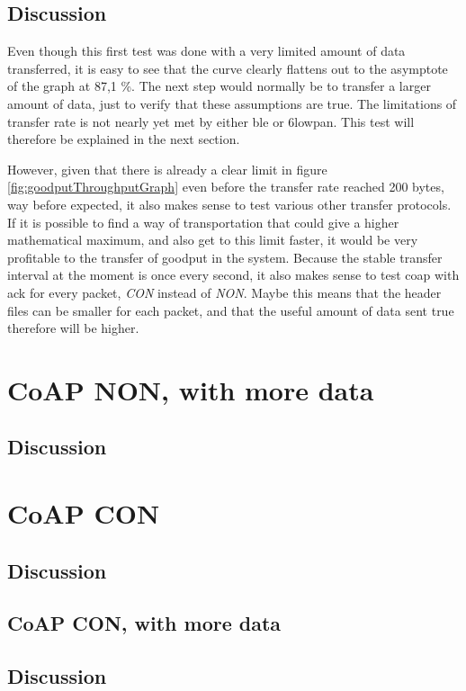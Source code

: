 \subsection{Discussion}

Even though this first test was done with a very limited amount of data transferred, it is easy to see that the curve clearly flattens out to the asymptote of the graph at 87,1 \%. The next step would normally be to transfer a larger amount of data, just to verify that these assumptions are true. The limitations of transfer rate is not nearly yet met by either \gls{ble} or \gls{6lowpan}. This test will therefore be explained in the next section. 

However, given that there is already a clear limit in figure \ref{fig:goodputThroughputGraph} even before the transfer rate reached 200 bytes, way before expected, it also makes sense to test various other transfer protocols. If it is possible to find a way of transportation that could give a higher mathematical maximum, and also get to this limit faster, it would be very profitable to the transfer of goodput in the system. Because the stable transfer interval at the moment is once every second, it also makes sense to test \gls{coap} with \gls{ack} for every packet, \textit{CON} instead of \textit{NON}. Maybe this means that the header files can be smaller for each packet, and that the useful amount of data sent true therefore will be higher. 


\section{CoAP NON, with more data}

\subsection{Discussion}

\section{CoAP CON}

\subsection{Discussion}

\subsection{CoAP CON, with more data}

\subsection{Discussion}

